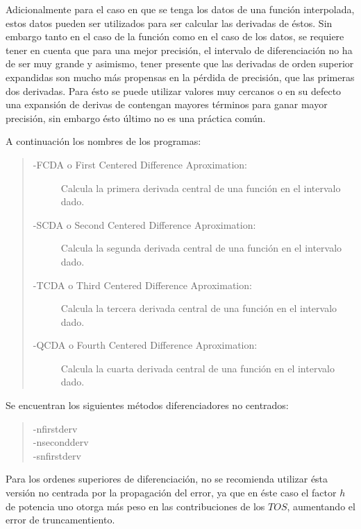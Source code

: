 \documentclass[letterpaper,10pt,oneside]{sphinxmanual}
\theoremstyle{plain}%
\theoremstyle{definition}%
\theoremstyle{remark}%
\begin{document}
Adicionalmente para el caso en que se tenga los datos de una función interpolada, estos datos pueden ser utilizados para ser calcular las derivadas de éstos. Sin embargo tanto en el caso de la función como en el caso de los datos, se requiere tener en cuenta que para una mejor precisión, el intervalo de diferenciación no ha de ser muy grande y asimismo, tener presente que las derivadas de orden superior expandidas son mucho más propensas en la pérdida de precisión, que las primeras dos derivadas. Para ésto se puede utilizar valores muy cercanos o en su defecto una expansión de derivas de contengan mayores términos para ganar mayor precisión, sin embargo ésto último no es una práctica común.

A continuación los nombres de los programas:

\begin{quote}
\begin{description}
\item[{-FCDA o First Centered Difference Aproximation:}] \leavevmode
Calcula la primera derivada central de una función en el intervalo dado.

\item[{-SCDA o Second Centered Difference Aproximation:}] \leavevmode
Calcula la segunda derivada central de una función en el intervalo dado.

\item[{-TCDA o Third Centered Difference Aproximation:}] \leavevmode
Calcula la tercera derivada central de una función en el intervalo dado.

\item[{-QCDA o Fourth Centered Difference Aproximation:}] \leavevmode
Calcula la cuarta derivada central de una función en el intervalo dado.

\end{description}
\end{quote}

Se encuentran los siguientes métodos diferenciadores no centrados:
\begin{quote}
\begin{description}
\item[{-nfirstderv}]\leavevmode
\item[{-nsecondderv}]\leavevmode
\item[{-snfirstderv}]\leavevmode
\end{description}
\end{quote}

Para los ordenes superiores de diferenciación, no se recomienda utilizar ésta versión no centrada por la propagación del error, ya que en éste caso el factor $h$ de potencia uno otorga más peso en las contribuciones de los $TOS$, aumentando el error de truncamentiento.
\end{document}
